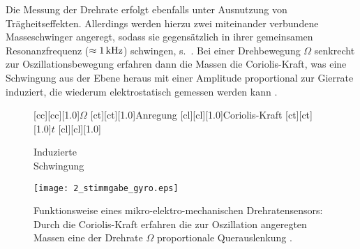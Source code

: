 Die Messung der Drehrate erfolgt ebenfalls unter Ausnutzung von Trägheitseffekten. Allerdings werden hierzu zwei miteinander verbundene Masseschwinger angeregt, sodass sie gegensätzlich in ihrer gemeinsamen Resonanzfrequenz ($\approx \unit[1]{kHz}$) schwingen, s.\ . Bei einer Drehbewegung $\Omega$ senkrecht zur Oszillationsbewegung erfahren dann die Massen die Coriolis-Kraft, was eine Schwingung aus der Ebene heraus mit einer Amplitude proportional zur Gierrate induziert, die wiederum elektrostatisch gemessen werden kann \cite{reif2010sensoren}.
\begin{figure}[h]
\newcommand{\smallsize}{.75}
	[cc][cc][1.0]{$\Omega$}
	[ct][ct][1.0]{Anregung}
	[cl][cl][1.0]{Coriolis-Kraft}
	[ct][ct][1.0]{$t$}
	[cl][cl][1.0]{\parbox[r]{1.5cm}{Induzierte \\ Schwingung}}
\centering
\texttt{[image: 2\_stimmgabe\_gyro.eps]}
 \caption[Funktionsweise eines Drehratensensors]{Funktionsweise eines mikro-elektro-mechanischen Drehratensensors: Durch die Coriolis-Kraft erfahren die zur Oszillation angeregten Massen eine der Drehrate $\Omega$ proportionale Querauslenkung \cite{reif2010sensoren}.}
 \label{fig:stimmgabe_gyro}
\end{figure}


